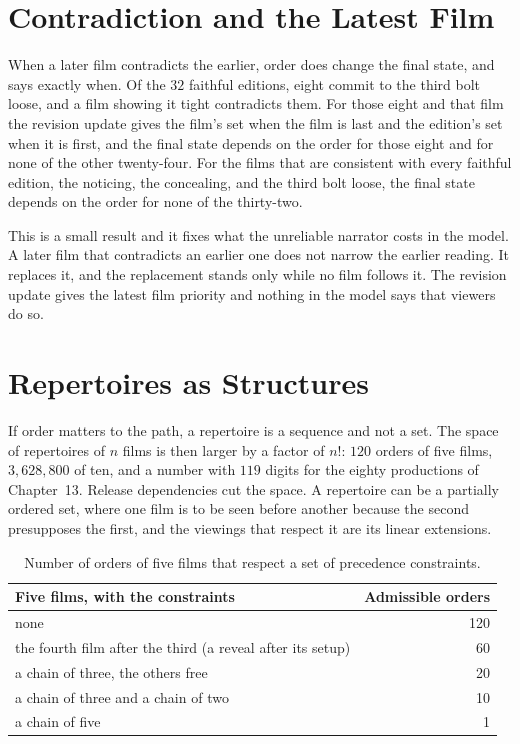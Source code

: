 \documentclass[11pt,twoside,openright]{book}
\theoremstyle{plain}
\theoremstyle{definition}
\theoremstyle{remark}
\begin{document}
\section{Contradiction and the Latest Film}\label{sec:contra14}

When a later film contradicts the earlier, order does change the final state, and  says exactly when. Of the $32$ faithful editions, eight commit to the third bolt loose, and a film showing it tight contradicts them. For those eight and that film the revision update gives the film's set when the film is last and the edition's set when it is first, and the final state depends on the order for those eight and for none of the other twenty-four. For the films that are consistent with every faithful edition, the noticing, the concealing, and the third bolt loose, the final state depends on the order for none of the thirty-two.

This is a small result and it fixes what the unreliable narrator costs in the model. A later film that contradicts an earlier one does not narrow the earlier reading. It replaces it, and the replacement stands only while no film follows it. The revision update gives the latest film priority and nothing in the model says that viewers do so.

\section{Repertoires as Structures}\label{sec:struct14}

If order matters to the path, a repertoire is a sequence and not a set. The space of repertoires of $n$ films is then larger by a factor of $n!$: $120$ orders of five films, $3{,}628{,}800$ of ten, and a number with $119$ digits for the eighty productions of Chapter~13. Release dependencies cut the space. A repertoire can be a partially ordered set, where one film is to be seen before another because the second presupposes the first, and the viewings that respect it are its linear extensions.

\begin{table}[ht]
\centering
\begin{tabular}{@{}lr@{}}
\toprule
Five films, with the constraints & Admissible orders\\
\midrule
none & 120\\
the fourth film after the third (a reveal after its setup) & 60\\
a chain of three, the others free & 20\\
a chain of three and a chain of two & 10\\
a chain of five & 1\\
\bottomrule
\end{tabular}
\caption{Number of orders of five films that respect a set of precedence constraints.}\label{tab:ext14}
\end{table}
\end{document}
